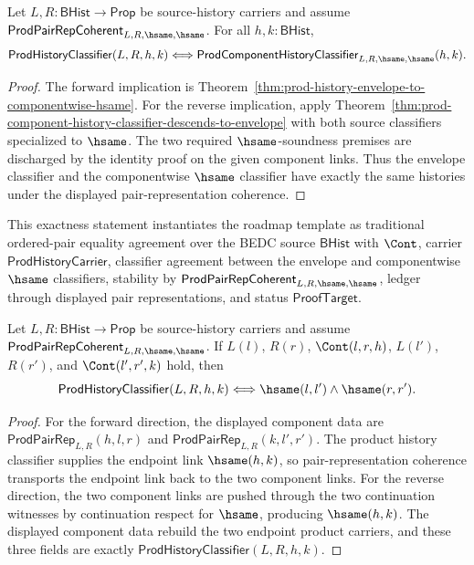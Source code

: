 \begin{theorem}
\label{thm:prod-envelope-componentwise-hsame-classifiers-coincide}
Let $L,R:\mathsf{BHist}\to\mathsf{Prop}$ be source-history carriers and assume
$\mathsf{ProdPairRepCoherent}_{L,R,\hsame,\hsame}$. For all
$h,k:\mathsf{BHist}$,
$$
\mathsf{ProdHistoryClassifier}(L,R,h,k)
\Longleftrightarrow
\mathsf{ProdComponentHistoryClassifier}_{L,R,\hsame,\hsame}(h,k).
$$
\end{theorem}
\begin{proof}
The forward implication is Theorem~\ref{thm:prod-history-envelope-to-componentwise-hsame}.
For the reverse implication, apply
Theorem~\ref{thm:prod-component-history-classifier-descends-to-envelope}
with both source classifiers specialized to $\hsame$. The two required
$\hsame$-soundness premises are discharged by the identity proof on the given
component links. Thus the envelope classifier and the componentwise $\hsame$
classifier have exactly the same histories under the displayed
pair-representation coherence.
\end{proof}

This exactness statement instantiates the roadmap template as traditional
ordered-pair equality agreement over the BEDC source $\mathsf{BHist}$ with
$\Cont$, carrier $\mathsf{ProdHistoryCarrier}$, classifier agreement between
the envelope and componentwise $\hsame$ classifiers, stability by
$\mathsf{ProdPairRepCoherent}_{L,R,\hsame,\hsame}$, ledger through displayed
pair representations, and status $\mathsf{ProofTarget}$.

\begin{theorem}
\label{thm:prod-history-classifier-displayed-component-hsame-iff}
Let $L,R:\mathsf{BHist}\to\mathsf{Prop}$ be source-history carriers and assume
$\mathsf{ProdPairRepCoherent}_{L,R,\hsame,\hsame}$. If
$L(l)$, $R(r)$, $\Cont(l,r,h)$, $L(l')$, $R(r')$, and
$\Cont(l',r',k)$ hold, then
$$
\mathsf{ProdHistoryClassifier}(L,R,h,k)
\Longleftrightarrow
\hsame(l,l')\wedge\hsame(r,r').
$$
\end{theorem}
\begin{proof}
For the forward direction, the displayed component data are
$\mathsf{ProdPairRep}_{L,R}(h,l,r)$ and
$\mathsf{ProdPairRep}_{L,R}(k,l',r')$. The product history classifier supplies
the endpoint link $\hsame(h,k)$, so pair-representation coherence transports
the endpoint link back to the two component links. For the reverse direction,
the two component links are pushed through the two continuation witnesses by
continuation respect for $\hsame$, producing $\hsame(h,k)$. The displayed
component data rebuild the two endpoint product carriers, and these three
fields are exactly $\mathsf{ProdHistoryClassifier}(L,R,h,k)$.
\end{proof}


